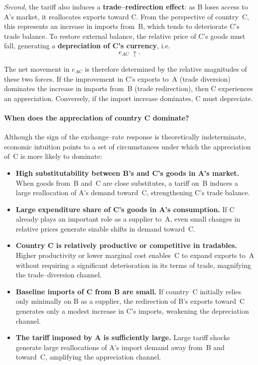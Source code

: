\documentclass[11pt]{article}
\begin{document}
\emph{Second}, the tariff also induces a \textbf{trade–redirection effect}:
as B loses access to A's market, it reallocates exports toward C. From
the perspective of country~C, this represents an increase in imports from~B,
which tends to deteriorate C's trade balance. To restore external balance,
the relative price of C's goods must fall, generating a
\textbf{depreciation of C's currency}, i.e.
\[
e_{AC} \;\uparrow.
\]

The net movement in $e_{AC}$ is therefore determined by the relative
magnitudes of these two forces. If the improvement in C's exports to~A
(trade diversion) dominates the increase in imports from~B (trade
redirection), then C experiences an appreciation. Conversely, if the
import increase dominates, C must depreciate.

\paragraph{When does the appreciation of country C dominate?}

Although the sign of the exchange–rate response is theoretically
indeterminate, economic intuition points to a set of circumstances under
which the appreciation of~C is more likely to dominate:

\begin{itemize}
    \item \textbf{High substitutability between B's and C's goods in A's
    market.} When goods from~B and~C are close substitutes, a tariff on~B
    induces a large reallocation of A's demand toward~C, strengthening C's
    trade balance.

    \item \textbf{Large expenditure share of C's goods in A's consumption.}
    If C already plays an important role as a supplier to~A, even small
    changes in relative prices generate sizable shifts in demand toward~C.

    \item \textbf{Country C is relatively productive or competitive in
    tradables.} Higher productivity or lower marginal cost enables~C to
    expand exports to~A without requiring a significant deterioration in
    its terms of trade, magnifying the trade–diversion channel.

    \item \textbf{Baseline imports of C from B are small.}
    If country~C initially relies only minimally on B as a supplier, the
    redirection of B’s exports toward~C generates only a modest increase in
    C’s imports, weakening the depreciation channel.

    \item \textbf{The tariff imposed by A is sufficiently large.}
    Large tariff shocks generate large reallocations of A's import demand
    away from~B and toward~C, amplifying the appreciation channel.

\end{itemize}
\end{document}
